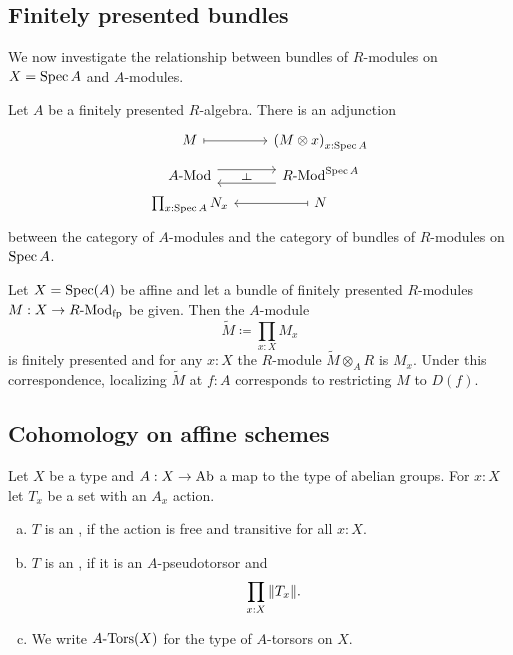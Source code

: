 \subsection{Finitely presented bundles}

We now investigate the relationship between bundles of $R$-modules on $X = \operatorname{Spec} A$
and $A$-modules.

\begin{proposition}
  Let $A$ be a finitely presented $R$-algebra.
  There is an adjunction
  \[ \begin{tikzcd}[row sep=tiny]
    M \ar[r, mapsto] & {(M \otimes x)}_{x : \Spec A} \\
    \Mod{A} \ar[r, shift left=2] \ar[r, phantom, "\rotatebox{90}{$\vdash$}"] &
    \Mod{R}^{\Spec A} \ar[l, shift left=2] \\
    \prod_{x : \Spec A} N_x & N \ar[l, mapsto]
  \end{tikzcd} \]
  between the category of $A$-modules
  and the category of bundles of $R$-modules on $\operatorname{Spec} A$.
\end{proposition}

\begin{theorem}%
  \label{fp-module}
  Let $X=\operatorname{Spec}(A)$ be affine and
  let a bundle of finitely presented $R$-modules $M : X\to R\text{-}\mathrm{Mod}_{\text{fp}}$ be given.
  Then the $A$-module
  \[ \tilde{M}\coloneqq\prod_{x:X}M_x \]
  is finitely presented and for any $x:X$ the $R$-module $\tilde{M}\otimes_A R$ is $M_x$.
  Under this correspondence, localizing $\tilde{M}$ at $f:A$ corresponds to restricting $M$ to $D(f)$.
\end{theorem}

\subsection{Cohomology on affine schemes}

\begin{definition}%
  \label{torsor}
  Let $X$ be a type and $A:X\to \operatorname{Ab}$ a map to the type of abelian groups.
  For $x:X$ let $T_x$ be a set with an $A_x$ action.
  \begin{enumerate}[(a)]
  \item $T$ is an , if the action is free and transitive for all $x:X$.
  \item $T$ is an , if it is an $A$-pseudotorsor and
    \[ \prod_{x:X} \| T_x \| \rlap{.}\]
  \item We write $A\text{-}\mathrm{Tors}(X)$ for the type of $A$-torsors on $X$.
  \end{enumerate}
\end{definition}

